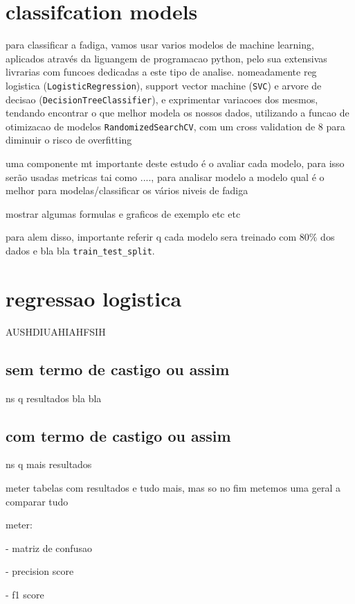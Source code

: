 \documentclass[conference]{IEEEtran}
\begin{document}
\section{classifcation models}

para classificar a fadiga, vamos usar varios modelos de machine learning, aplicados através da liguangem de programacao python, pelo sua extensivas livrarias com funcoes dedicadas a este tipo de analise. nomeadamente reg logistica (\texttt{LogisticRegression}), support vector machine (\texttt{SVC}) e arvore de decisao (\texttt{DecisionTreeClassifier}), e exprimentar variacoes dos mesmos, tendando encontrar o que melhor modela os nossos dados, utilizando a funcao de otimizacao de modelos \texttt{RandomizedSearchCV}, com um cross validation de 8 para diminuir o risco de overfitting

uma componente mt importante deste estudo é o avaliar cada modelo, para isso serão usadas metricas tai como ...., para analisar modelo a modelo qual é o melhor para modelas/classificar os vários niveis de fadiga

mostrar algumas formulas e graficos de exemplo etc etc

para alem disso, importante referir q cada modelo sera treinado com $80\%$ dos dados e bla bla \texttt{train\_test\_split}.


\section{regressao logistica}

AUSHDIUAHIAHFSIH


\subsection{sem termo de castigo ou assim}

ns q resultados bla bla

\subsection{com termo de castigo ou assim}

ns q mais resultados

meter tabelas com resultados e tudo mais, mas so no fim metemos uma geral a comparar tudo

meter:

- matriz de confusao

- precision score

- f1 score
\end{document}
